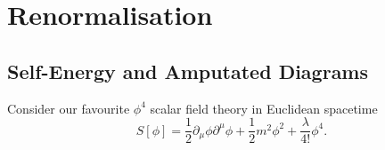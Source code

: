 \section{Renormalisation}%
\label{sec:renormalisation}

\subsection{Self-Energy and Amputated Diagrams}%
\label{sub:self_energy_operator_and_truncated_graphs}

Consider our favourite $\phi^4$ scalar field theory in Euclidean spacetime
\begin{equation}
  S[\phi] = \frac{1}{2} \partial_{\mu} \phi \partial^{\mu} \phi + \frac{1}{2} m^2 \phi^2 + \frac{\lambda}{4!} \phi^4.
\end{equation}

